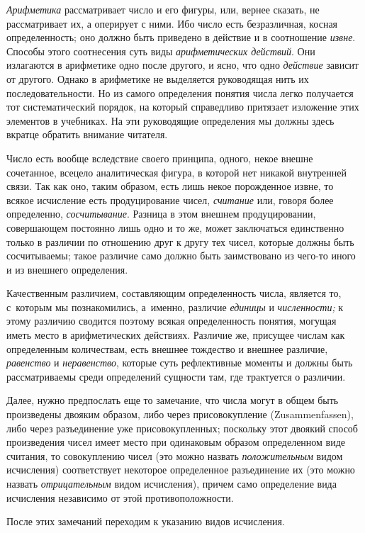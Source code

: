{\em Арифметика} рассматривает число и его фигуры, или, вернее сказать, не
рассматривает их, а оперирует с ними. Ибо число есть безразличная, косная
определенность; оно должно быть приведено в действие и в соотношение
{\em извне}. Способы этого соотнесения суть виды {\em арифметических действий}.
Они излагаются в арифметике одно после другого, и ясно, что одно {\em действие}
зависит от другого. Однако в арифметике не выделяется руководящая нить их
последовательности. Но из самого определения понятия числа легко получается тот
систематический порядок, на который справедливо притязает изложение этих
элементов в учебниках. На эти руководящие определения мы должны здесь вкратце
обратить внимание читателя.

Число есть вообще вследствие своего принципа, одного, некое внешне сочетанное,
всецело аналитическая фигура, в которой нет никакой внутренней связи. Так как
оно, таким образом, есть лишь некое порожденное извне, то всякое исчисление
есть продуцирование чисел, {\em считание} или, говоря более определенно,
{\em сосчитывание}. Разница в этом внешнем продуцировании, совершающем
постоянно лишь одно и то же, может заключаться единственно только в различии по
отношению друг к другу тех чисел, которые должны быть сосчитываемы; такое
различие само должно быть заимствовано из чего-то иного и из внешнего
определения.

Качественным различием, составляющим определенность числа, является то,
с~которым мы познакомились, а~именно, различие {\em единицы} и {\em численности;}
к этому различию сводится поэтому всякая определенность понятия, могущая иметь
место в арифметических действиях. Различие же, присущее числам как определенным
количествам, есть внешнее тождество и внешнее различие, {\em равенство} и
{\em неравенство}, которые суть рефлективные моменты и должны быть
рассматриваемы среди определений сущности там, где трактуется о различии.

Далее, нужно предпослать еще то замечание, что числа могут в общем быть
произведены двояким образом, либо через присовокупление
(Zu\-sam\-men\-fas\-sen), либо через разъединение уже присовокупленных;
поскольку этот двоякий способ произведения чисел имеет место при одинаковым
образом определенном виде считания, то совокуплению чисел (это можно назвать
{\em положительным} видом исчисления) соответствует некоторое определенное
разъединение их (это можно назвать {\em отрицательным} видом исчисления),
причем само определение вида исчисления независимо от этой противоположности.

После этих замечаний переходим к указанию видов исчисления.


